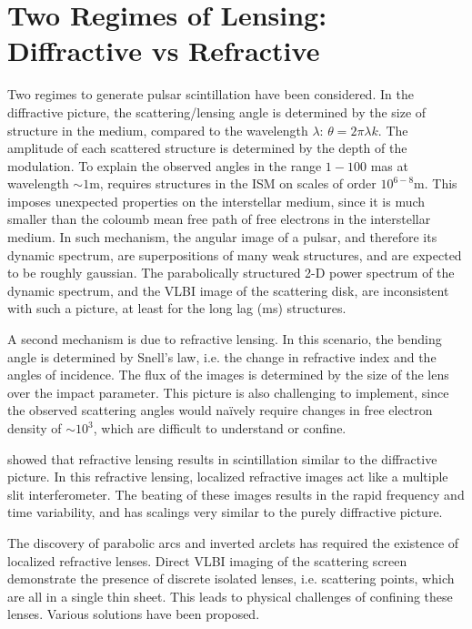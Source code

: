 \documentclass[useAMS,usenatbib]{mn2e}
\begin{document}
\section{Two Regimes of Lensing: Diffractive vs Refractive}

Two regimes to generate pulsar scintillation have been considered. In
the diffractive picture, the scattering/lensing angle is determined by
the size of structure in the medium, compared to the wavelength
$\lambda$: $\theta=2\pi\lambda k$.  The amplitude of each scattered
structure is determined by the depth of the modulation.  To explain
the observed angles in the range $1-100$ mas at wavelength $\sim 1$m,
requires structures in the ISM on scales of order $10^{6-8}$m. This
imposes unexpected properties on the interstellar medium, since it is
much smaller than the coloumb mean free path of free electrons in the
interstellar medium.  In such mechanism, the angular image of a
pulsar, and therefore its dynamic spectrum, are superpositions of many
weak structures, and are expected to be roughly gaussian.  The
parabolically structured 2-D power spectrum of the dynamic spectrum,
and the VLBI image of the scattering disk, are inconsistent with such
a picture, at least for the long lag (ms) structures.

A second mechanism is due to refractive lensing.  In this scenario,
the bending angle is determined by Snell's law, i.e. the change in
refractive index and the angles of incidence.  The flux of the images
is determined by the size of the lens over the impact parameter.  This
picture is also challenging to implement, since the observed
scattering angles would na\"ively require changes in free electron
density of $\sim 10^3$, which are difficult to understand or confine.

\cite{2006ApJ...640L.159G} showed that refractive lensing results in
scintillation similar to the diffractive picture.  In this refractive
lensing, localized refractive images act like a multiple slit
interferometer. The beating of these images results in the rapid
frequency and time variability, and has scalings very similar to the
purely diffractive picture. 

The discovery of parabolic arcs\citep{2001ApJ...549L..97S} and
inverted arclets has required the existence of localized refractive
lenses.  Direct VLBI imaging of the scattering
screen\citep{2010ApJ...708..232B} demonstrate the presence of
discrete isolated lenses, i.e. scattering points, which are all in a
single thin sheet. This leads to physical challenges of confining
these lenses. Various solutions have been
proposed\citep{2007ASPC..365..299W,2012MNRAS.421L.132P,2006ApJ...640L.159G}.
\end{document}
